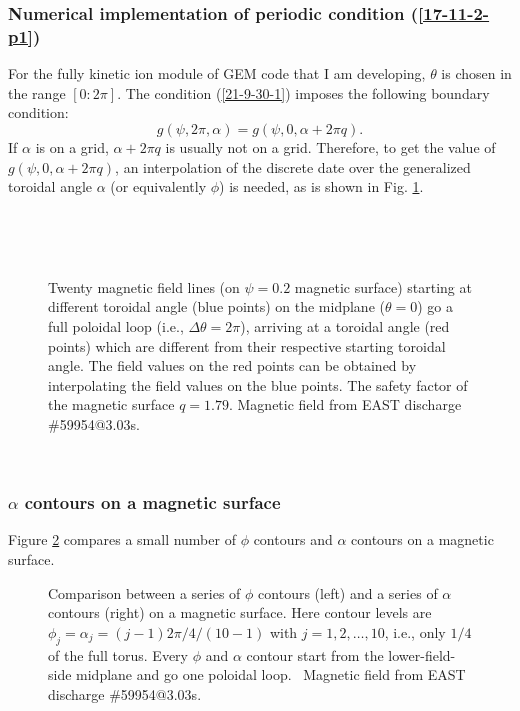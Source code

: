 \documentclass{llncs}
\begin{document}
\subsubsection{Numerical implementation of periodic condition
(\ref{17-11-2-p1})}

For the fully kinetic ion module of GEM code that I am developing, $\theta$ is
chosen in the range $[0 : 2 \pi]$. The condition (\ref{21-9-30-1}) imposes the
following boundary condition:
\begin{equation}
  g (\psi, 2 \pi, \alpha) = g (\psi, 0, \alpha + 2 \pi q) .
\end{equation}
If $\alpha$ is on a grid, $\alpha + 2 \pi q$ is usually not on a grid.
Therefore, to get the value of $g (\psi, 0, \alpha + 2 \pi q)$, an
interpolation of the discrete date over the generalized toroidal angle
$\alpha$ (or equivalently $\phi$) is needed, as is shown in Fig.
\ref{17-11-2-1}.

\

\

\begin{figure}[h]
  \caption{\label{17-11-2-1}Twenty magnetic field lines (on $\psi = 0.2$
  magnetic surface) starting at different toroidal angle (blue points) on the
  midplane ($\theta = 0$) go a full poloidal loop (i.e., $\Delta \theta = 2
  \pi$), arriving at a toroidal angle (red points) which are different from
  their respective starting toroidal angle. The field values on the red points
  can be obtained by interpolating the field values on the blue points. The
  safety factor of the magnetic surface $q = 1.79$. Magnetic field from EAST
  discharge \#59954@3.03s.}
\end{figure}

\

\subsubsection{$\alpha$ contours on a magnetic surface}

Figure \ref{17-10-29-1} compares a small number of $\phi$ contours and
$\alpha$ contours on a magnetic surface.

\begin{figure}[h]
  \caption{\label{17-10-29-1}Comparison between a series of $\phi$ contours
  (left) and a series of $\alpha$ contours (right) on a magnetic surface. Here
  contour levels are $\phi_j = \alpha_j = (j - 1) 2 \pi / 4 / (10 - 1)$ with
  $j = 1, 2, \ldots, 10$, i.e., only $1 / 4$ of the full torus. Every $\phi$
  and $\alpha$ contour start from the lower-field-side midplane and go one
  poloidal loop. \ Magnetic field from EAST discharge \#59954@3.03s.}
\end{figure}
\end{document}
